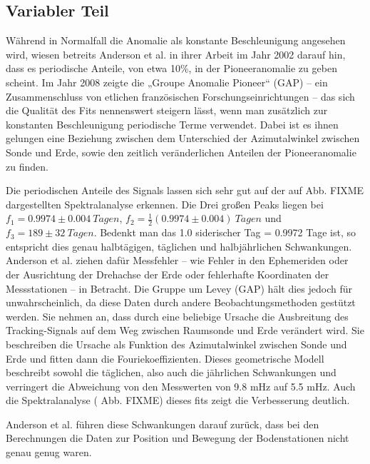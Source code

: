 
\subsection{Variabler Teil}
Während in Normalfall die Anomalie als konstante Beschleunigung angesehen wird, wiesen betreits Anderson et al. in
ihrer Arbeit im Jahr 2002 darauf hin, dass es periodische Anteile, von etwa 10\%, in der Pioneeranomalie zu
geben scheint. Im Jahr 2008
zeigte die „Groupe Anomalie Pioneer“ (GAP) – ein Zusammenschluss von etlichen französischen Forschungseinrichtungen –
das sich die Qualität des Fits nennenswert steigern lässt, wenn man zusätzlich zur konstanten Beschleunigung
periodische Terme verwendet.
Dabei ist es ihnen gelungen eine Beziehung zwischen dem Unterschied der Azimutalwinkel zwischen Sonde und Erde, sowie
den zeitlich veränderlichen Anteilen der Pioneeranomalie zu finden. %

Die periodischen Anteile des Signals lassen sich sehr gut auf der auf Abb. FIXME dargestellten Spektralanalyse
erkennen. Die Drei großen Peaks liegen bei $f_1=0.9974\pm0.004\ Tagen$, $f_2=\frac12(0.9974\pm0.004)\ Tagen$ und 
$f_3=189\pm32\ Tagen$. Bedenkt man das 1.0 siderischer Tag = 0.9972 Tage ist, so entspricht dies genau
halbtägigen, täglichen und halbjährlichen Schwankungen. Anderson et al. ziehen dafür Messfehler – wie Fehler in den
Ephemeriden oder der Ausrichtung der Drehachse der Erde oder fehlerhafte Koordinaten der Messstationen – in Betracht.
Die Gruppe um Levey (GAP) hält dies jedoch für unwahrscheinlich, da diese Daten durch andere Beobachtungsmethoden
gestützt werden.
Sie nehmen an, dass durch eine beliebige Ursache die Ausbreitung des Tracking-Signals auf dem Weg zwischen Raumsonde und
Erde verändert wird. Sie beschreiben die Ursache als Funktion des Azimutalwinkel zwischen Sonde und Erde und fitten
dann die Fouriekoeffizienten. Dieses geometrische Modell beschreibt sowohl die täglichen, also auch die jährlichen
Schwankungen und verringert die Abweichung von den Messwerten von 9.8 mHz auf 5.5 mHz. Auch die Spektralanalyse (
Abb. FIXME) dieses fits zeigt die Verbesserung deutlich.\cite{Levy2008} %

Anderson et al. führen diese Schwankungen darauf zurück, dass bei den Berechnungen die Daten zur Position und Bewegung
der Bodenstationen nicht genau genug waren.\cite{Ditttus2006} %